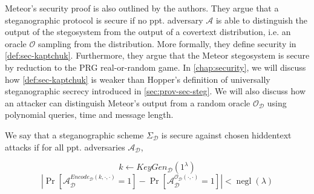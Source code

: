 Meteor's security proof is also outlined by the authors.
They argue that a steganographic protocol is secure if no ppt. adversary $\mathcal{A}$ is able to distinguish the output of the stegosystem from the output of a covertext distribution, i.e. an oracle $\mathcal{O}$ sampling from the distribution. 
More formally, they define security in \autoref{def:sec-kaptchuk}. 
Furthermore, they argue that the Meteor stegosystem is secure by reduction to the PRG real-or-random game. 
In \autoref{chap:security}, we will discuss how \autoref{def:sec-kaptchuk} is weaker than Hopper's definition of universally steganographic secrecy introduced in \autoref{sec:prov-sec-steg}.
We will also discuss how an attacker can distinguish Meteor's output from a random oracle $\mathcal{O}_{\mathcal{D}}$ using polynomial queries, time and message length.

\begin{definition}
	\label{def:sec-kaptchuk}
	We say that a steganographic scheme $\Sigma_{\mathcal{D}}$ is secure against chosen hiddentext attacks if for all ppt. adversaries $\mathcal{A}_{\mathcal{D}}$,
	
	$$k \leftarrow KeyGen_{\mathcal{D}}(1^\lambda)$$
	$$\left| \mathop{Pr}\left[ \mathcal{A}_{\mathcal{D}}^{Encode_{\mathcal{D}}(k, \cdot, \cdot)}=1 \right] - \mathop{Pr}\left[ \mathcal{A}_{\mathcal{D}}^{\mathcal{O}_{\mathcal{D}}(\cdot, \cdot)}=1 \right] \right| < \mathop{negl}(\lambda)$$
\end{definition}
